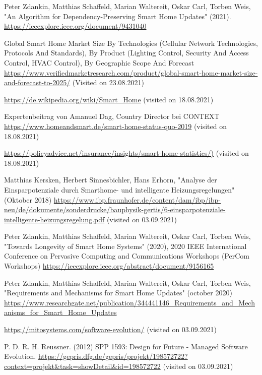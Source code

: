\begin{thebibliography}{9}

Peter Zdankin, Matthias Schaffeld, Marian Waltereit, Oskar Carl, Torben Weis, "An Algorithm for Dependency-Preserving Smart Home Updates" (2021).
\url{https://ieeexplore.ieee.org/document/9431040}

Global Smart Home Market Size By Technologies (Cellular Network Technologies, Protocols And Standards), By Product
(Lighting Control, Security And Access Control, HVAC Control), By Geographic Scope And Forecast
\url{https://www.verifiedmarketresearch.com/product/global-smart-home-market-size-and-forecast-to-2025/} (Visited on 23.08.2021)

\url{https://de.wikipedia.org/wiki/Smart_Home} (visited on 18.08.2021)

Expertenbeitrag von Amanuel Dag, Country Director bei CONTEXT
\url{https://www.homeandsmart.de/smart-home-status-quo-2019} (visited on 18.08.2021)

\url{https://policyadvice.net/insurance/insights/smart-home-statistics/)} (visited on 18.08.2021)

Matthias Kersken, Herbert Sinnesbichler, Hans Erhorn, "Analyse der Einsparpotenziale durch Smarthome- und intelligente Heizungsregelungen" (Oktober 2018)
\url{https://www.ibp.fraunhofer.de/content/dam/ibp/ibp-neu/de/dokumente/sonderdrucke/bauphysik-gertis/6-einsparpotenziale-intelligente-heizungsregelung.pdf} (visited on 03.09.2021)

Peter Zdankin, Matthias Schaffeld, Marian Waltereit, Oskar Carl, Torben Weis, "Towards Longevity of Smart Home Systems" (2020),
2020 IEEE International Conference on Pervasive Computing and Communications Workshops (PerCom Workshops)
\url{https://ieeexplore.ieee.org/abstract/document/9156165}

Peter Zdankin, Matthias Schaffeld, Marian Waltereit, Oskar Carl, Torben Weis, "Requirements and Mechanisms for Smart Home Updates" (october 2020)
\url{https://www.researchgate.net/publication/344441146_Requirements_and_Mechanisms_for_Smart_Home_Updates}

\url{https://mitosystems.com/software-evolution/} (visited on 03.09.2021)

P. D. R. H. Reussner. (2012) SPP 1593: Design
for Future - Managed Software Evolution.
\url{https://gepris.dfg.de/gepris/projekt/198572722?context=projekt&task=showDetail\&id=198572722} (visited on 03.09.2021)


\end{thebibliography}

